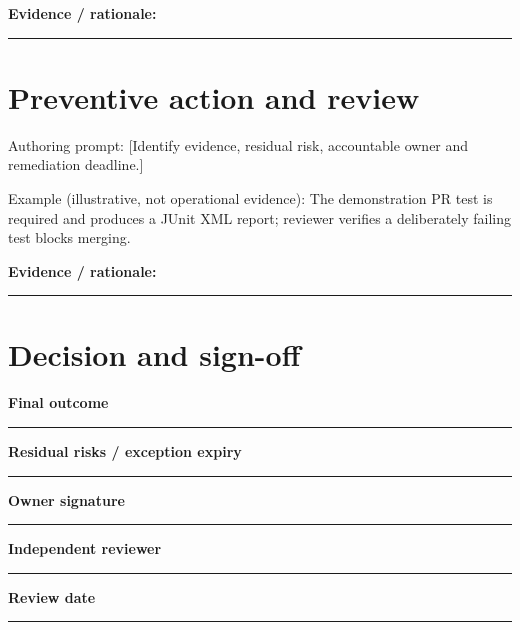 \documentclass[11pt,letterpaper]{article}
\begin{document}
\noindent\textbf{Evidence / rationale:}\par\nobreak\vspace{8pt}\noindent\rule{0.93\linewidth}{0.4pt}\par\vspace{14pt}
\section{Preventive action and review}
Authoring prompt: [Identify evidence, residual risk, accountable owner and remediation deadline.]

Example (illustrative, not operational evidence): The demonstration PR test is required and produces a JUnit XML report; reviewer verifies a deliberately failing test blocks merging.

\noindent\textbf{Evidence / rationale:}\par\nobreak\vspace{8pt}\noindent\rule{0.93\linewidth}{0.4pt}\par\vspace{14pt}
\section{Decision and sign-off}
\noindent\textbf{Final outcome}\par\nobreak\vspace{6pt}\noindent\rule{0.93\linewidth}{0.4pt}\par\vspace{14pt}
\noindent\textbf{Residual risks / exception expiry}\par\nobreak\vspace{6pt}\noindent\rule{0.93\linewidth}{0.4pt}\par\vspace{14pt}
\noindent\textbf{Owner signature}\par\nobreak\vspace{6pt}\noindent\rule{0.93\linewidth}{0.4pt}\par\vspace{14pt}
\noindent\textbf{Independent reviewer}\par\nobreak\vspace{6pt}\noindent\rule{0.93\linewidth}{0.4pt}\par\vspace{14pt}
\noindent\textbf{Review date}\par\nobreak\vspace{6pt}\noindent\rule{0.93\linewidth}{0.4pt}\par\vspace{14pt}
\end{document}
